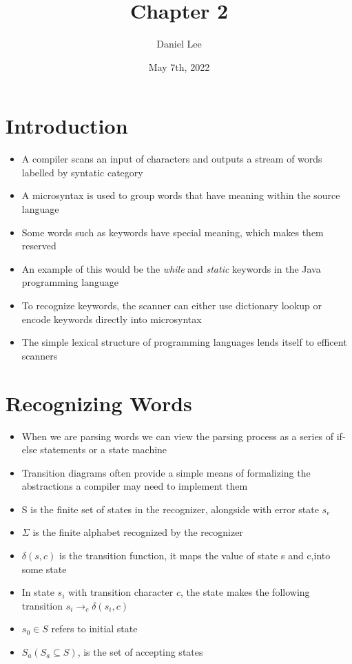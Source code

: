 \documentclass[20pt]{article}
\title{Chapter 2}
\author{Daniel Lee}
\date{May 7th,  2022}
\begin{document}
\maketitle
\newpage
\justify
\section*{Introduction}
    \begin{itemize}
        \item A compiler scans an input of characters and outputs a stream of words labelled by syntatic category
        \item A microsyntax is used to group words that have meaning within the source language  
        \item Some words such as keywords have special meaning, which makes them reserved 
        \item An example of this would be the \textit{while} and \textit{static} keywords in the Java programming language
        \item To recognize keywords, the scanner can either use dictionary lookup or encode keywords directly into microsyntax
        \item The simple lexical structure of programming languages lends itself to efficent scanners
    \end{itemize}
\section*{Recognizing Words}
    \begin{itemize}
        \item When we are parsing words we can view the parsing process as a series of if-else statements or a state machine 
        \item Transition diagrams often provide a simple means of formalizing the abstractions a compiler may need to implement them
        \item S is the finite set of states in the recognizer, alongside with error state $s_e$
        \item $\Sigma$ is the finite alphabet recognized by the recognizer 
        \item $\delta(s,c)$ is the transition function, it maps the value of state s and c,into some state
        \item In state $s_i$ with transition character $c$, the state makes the following transition $s_i \rightarrow_c \delta(s_i,c)$
        \item $s_0 \in S$ refers to initial state
        \item $S_a (S_a \subseteq S)$, is the set of accepting states
    \end{itemize}
\end{document}
